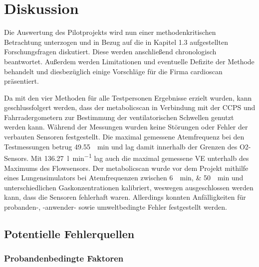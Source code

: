 \chapter{Diskussion}

Die Auswertung des Pilotprojekts wird nun einer methodenkritischen Betrachtung unterzogen und in Bezug auf die in Kapitel 1.3 aufgestellten Forschungsfragen diskutiert. Diese werden anschließend chronologisch beantwortet. Außerdem werden Limitationen und eventuelle Defizite der Methode behandelt und diesbezüglich einige Vorschläge für die Firma cardioscan präsentiert.
\par 
Da mit den vier Methoden für alle Testpersonen Ergebnisse erzielt wurden, kann geschlussfolgert werden, dass der metabolicscan in Verbindung mit der \acs{CCPS} und Fahrradergometern zur Bestimmung der ventilatorischen Schwellen genutzt werden kann. Während der Messungen wurden keine Störungen oder Fehler der verbauten Sensoren festgestellt. Die maximal gemessene Atemfrequenz bei den Testmessungen betrug \SI{49,55}{\per\minute} und lag damit innerhalb der Grenzen des \acs{O2}-Sensors. Mit \SI{136,27}{\litre\per\minute} lag auch die maximal gemessene \acs{VE} unterhalb des Maximums des Flowsensors. Der metabolicscan wurde vor dem Projekt mithilfe eines Lungensimulators bei Atemfrequenzen zwischen \SIlist{6;50}{\per\minute} und unterschiedlichen Gaskonzentrationen kalibriert, weswegen ausgeschlossen werden kann, dass die Sensoren fehlerhaft waren. Allerdings konnten Anfälligkeiten für probanden-, -anwender- sowie umweltbedingte Fehler festgestellt werden.

\section{Potentielle Fehlerquellen}

\subsection{Probandenbedingte Faktoren}

